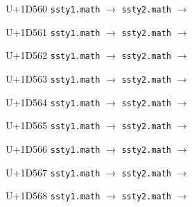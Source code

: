 \documentclass{article}
\begin{document}
\begin{substitutions}
\goodbreak

U+1D560  \linebreak
    \texttt{ssty1.math} $\to$  \linebreak
    \texttt{ssty2.math} $\to$  

\goodbreak

U+1D561  \linebreak
    \texttt{ssty1.math} $\to$  \linebreak
    \texttt{ssty2.math} $\to$  

\goodbreak

U+1D562  \linebreak
    \texttt{ssty1.math} $\to$  \linebreak
    \texttt{ssty2.math} $\to$  

\goodbreak

U+1D563  \linebreak
    \texttt{ssty1.math} $\to$  \linebreak
    \texttt{ssty2.math} $\to$  

\goodbreak

U+1D564  \linebreak
    \texttt{ssty1.math} $\to$  \linebreak
    \texttt{ssty2.math} $\to$  

\goodbreak

U+1D565  \linebreak
    \texttt{ssty1.math} $\to$  \linebreak
    \texttt{ssty2.math} $\to$  

\goodbreak

U+1D566  \linebreak
    \texttt{ssty1.math} $\to$  \linebreak
    \texttt{ssty2.math} $\to$  

\goodbreak

U+1D567  \linebreak
    \texttt{ssty1.math} $\to$  \linebreak
    \texttt{ssty2.math} $\to$  

\goodbreak

U+1D568  \linebreak
    \texttt{ssty1.math} $\to$  \linebreak
    \texttt{ssty2.math} $\to$  


\end{substitutions}
\end{document}
